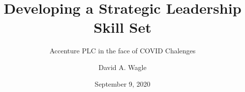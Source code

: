 \title[Strategic Leadership]
                 {Developing a Strategic Leadership Skill Set}

\subtitle{Accenture PLC in the face of COVID Chalenges}

\author{David A. Wagle}


\date{September 9, 2020}

